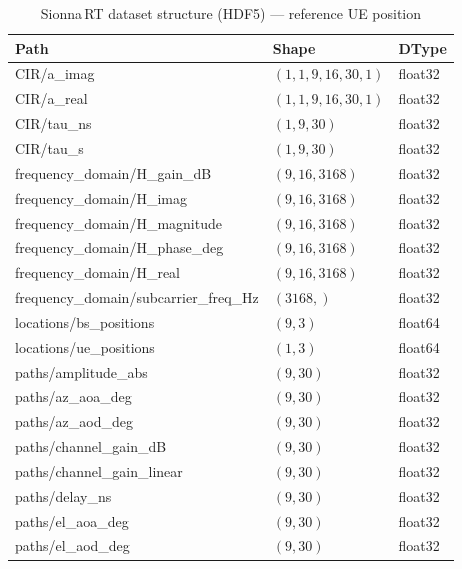 \begin{table}[htbp]
\caption{Sionna\,RT dataset structure (HDF5) --- reference UE position}
\label{tab:sionna_dataset}
\centering
\begin{tabular}{lll}
\toprule
Path & Shape & DType \\
\midrule
CIR/a\_imag                          & $(1, 1, 9, 16, 30, 1)$ & float32 \\
CIR/a\_real                          & $(1, 1, 9, 16, 30, 1)$ & float32 \\
CIR/tau\_ns                          & $(1, 9, 30)$           & float32 \\
CIR/tau\_s                           & $(1, 9, 30)$           & float32 \\
frequency\_domain/H\_gain\_dB        & $(9, 16, 3168)$        & float32 \\
frequency\_domain/H\_imag            & $(9, 16, 3168)$        & float32 \\
frequency\_domain/H\_magnitude       & $(9, 16, 3168)$        & float32 \\
frequency\_domain/H\_phase\_deg      & $(9, 16, 3168)$        & float32 \\
frequency\_domain/H\_real            & $(9, 16, 3168)$        & float32 \\
frequency\_domain/subcarrier\_freq\_Hz & $(3168,)$            & float32 \\
locations/bs\_positions              & $(9, 3)$               & float64 \\
locations/ue\_positions              & $(1, 3)$               & float64 \\
paths/amplitude\_abs                 & $(9, 30)$              & float32 \\
paths/az\_aoa\_deg                   & $(9, 30)$              & float32 \\
paths/az\_aod\_deg                   & $(9, 30)$              & float32 \\
paths/channel\_gain\_dB              & $(9, 30)$              & float32 \\
paths/channel\_gain\_linear          & $(9, 30)$              & float32 \\
paths/delay\_ns                      & $(9, 30)$              & float32 \\
paths/el\_aoa\_deg                   & $(9, 30)$              & float32 \\
paths/el\_aod\_deg                   & $(9, 30)$              & float32 \\
\bottomrule
\end{tabular}
\end{table}
